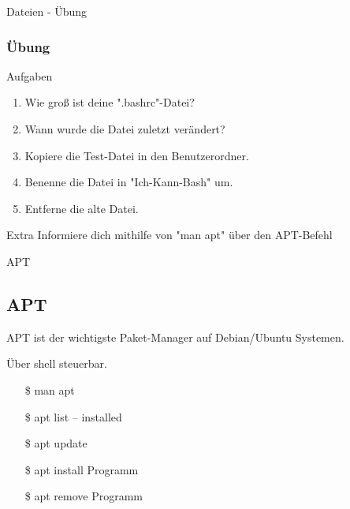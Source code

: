\begin{frame}{Dateien - Übung}
    \subsubsection{Übung}\label{subsubsec:übung}

    \begin{alertblock}{Aufgaben}
        \begin{enumerate}
            \item Wie groß ist deine ".bashrc"-Datei?
            \item Wann wurde die Datei zuletzt verändert?
            \item Kopiere die Test-Datei in den Benutzerordner.
            \item Benenne die Datei in "Ich-Kann-Bash" um.
            \item Entferne die alte Datei.
        \end{enumerate}
    \end{alertblock}


    \vspace{0.5cm}
    \begin{alertblock}{Extra}
        Informiere dich mithilfe von "man apt" über den APT-Befehl
    \end{alertblock}

\end{frame}

\begin{frame}{APT}
    \subsection{APT}\label{subsec:apt}

    APT ist der wichtigste Paket-Manager auf Debian/Ubuntu Systemen.

    \textrightarrow Über shell steuerbar.

    \begin{itemize}
        \item[\$] man apt
        \item[\$] apt list  -- installed
        \item[\$] apt update
        \item[\$] apt install Programm
        \item[\$] apt remove Programm
    \end{itemize}

\end{frame}

